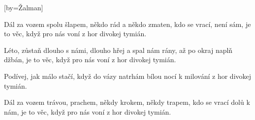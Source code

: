 [by={Žalman}]

\beginverse{}
Dál za vozem spolu šlapem,
někdo rád a někdo zmaten,
kdo se vrací, není sám,
je to věc, když pro nás voní
z hor divokej tymián.
\endverse{}

\beginverse{}
Léto, zůstaň dlouho s námi,
dlouho hřej a spal nám rány,
až po okraj naplň džbán,
je to věc, když pro nás voní
z hor divokej tymián.
\endverse{}

\beginchorus{}
Podívej, jak málo stačí, když do vázy natrhám
bílou nocí k milování z hor divokej tymián.
\endchorus{}

\beginverse{}
Dál za vozem trávou, prachem,
někdy krokem, někdy trapem,
kdo se vrací dolů k nám,
je to věc, když pro nás voní
z hor divokej tymián.
\endverse{}

\beginchorus{}
\phantom{}
\endchorus{}

\endsong{}
